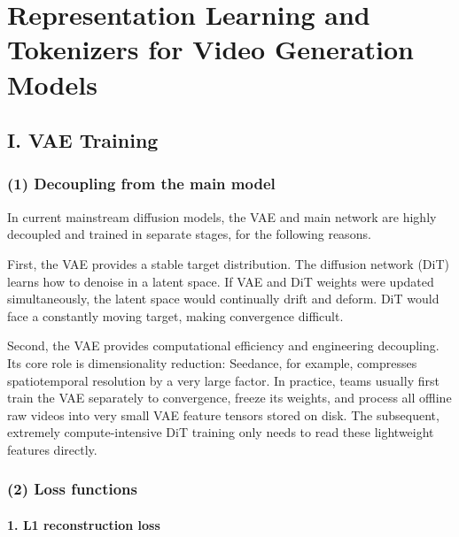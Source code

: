 \setcounter{section}{2}

\hypertarget{representation-learning-and-tokenizers-for-video-generation-models}{%
\section{Representation Learning and Tokenizers for Video Generation Models}\label{representation-learning-and-tokenizers-for-video-generation-models}}

\hypertarget{i.-vae-training}{%
\subsection{I. VAE Training}\label{i.-vae-training}}

\hypertarget{decoupling-from-the-main-model}{%
\subsubsection{(1) Decoupling from the main model}\label{decoupling-from-the-main-model}}

In current mainstream diffusion models, the VAE and main network are highly decoupled and trained in separate stages, for the following reasons.

First, the VAE provides a stable target distribution. The diffusion network (DiT) learns how to denoise in a latent space. If VAE and DiT weights were updated simultaneously, the latent space would continually drift and deform. DiT would face a constantly moving target, making convergence difficult.

Second, the VAE provides computational efficiency and engineering decoupling. Its core role is dimensionality reduction: Seedance, for example, compresses spatiotemporal resolution by a very large factor. In practice, teams usually first train the VAE separately to convergence, freeze its weights, and process all offline raw videos into very small VAE feature tensors stored on disk. The subsequent, extremely compute-intensive DiT training only needs to read these lightweight features directly.

\hypertarget{loss-functions-1}{%
\subsubsection{(2) Loss functions}\label{loss-functions-1}}

\hypertarget{l1-reconstruction-loss}{%
\paragraph{1. L1 reconstruction loss}\label{l1-reconstruction-loss}}

